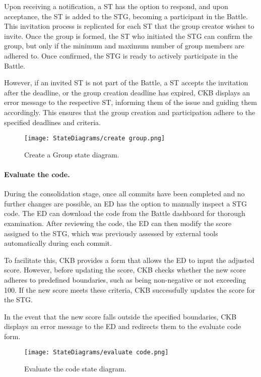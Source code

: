 Upon receiving a notification, a ST has the option to respond, and upon acceptance, the ST is added to the STG, becoming a participant in the Battle. This invitation process is replicated for each ST that the group creator wishes to invite. Once the group is formed, the ST who initiated the STG can confirm the group, but only if the minimum and maximum number of group members are adhered to. Once confirmed, the STG is ready to actively participate in the Battle.

However, if an invited ST is not part of the Battle, a ST accepts the invitation after the deadline, or the group creation deadline has expired, CKB displays an error message to the respective ST, informing them of the issue and guiding them accordingly. This ensures that the group creation and participation adhere to the specified deadlines and criteria.

\begin{figure}[H]
    \begin{center}
        \texttt{[image: StateDiagrams/create group.png]}
        \caption{Create a Group state diagram.}
        \label{fig:create_group_sd}%
    \end{center}
\end{figure}

\paragraph{Evaluate the code.}
During the consolidation stage, once all commits have been completed and no further changes are possible, an ED has the option to manually inspect a STG code. The ED can download the code from the Battle dashboard for thorough examination. After reviewing the code, the ED can then modify the score assigned to the STG, which was previously assessed by external tools automatically during each commit.

To facilitate this, CKB provides a form that allows the ED to input the adjusted score. However, before updating the score, CKB checks whether the new score adheres to predefined boundaries, such as being non-negative or not exceeding 100. If the new score meets these criteria, CKB successfully updates the score for the STG.

In the event that the new score falls outside the specified boundaries, CKB displays an error message to the ED and redirects them to the evaluate code form.

\begin{figure}[H]
    \begin{center}
        \texttt{[image: StateDiagrams/evaluate code.png]}
        \caption{Evaluate the code state diagram.}
        \label{fig:evaluate_code_sd}%
    \end{center}
\end{figure}

